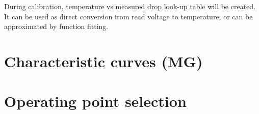         During calibration, temperature vs measured drop look-up table will be created. It can be used as direct conversion from read voltage to temperature, or can be approximated by function fitting.

\section{Characteristic curves (MG)}
\section{Operating point selection}
